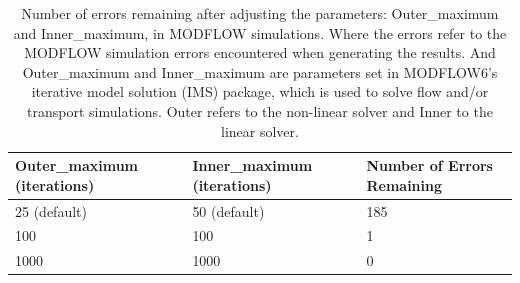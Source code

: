 \begin{table}[ht]
\centering
\caption{Number of errors remaining after adjusting the parameters: Outer\_maximum and Inner\_maximum, in MODFLOW simulations. Where the errors refer to the MODFLOW simulation errors encountered when generating the results. And Outer\_maximum and Inner\_maximum are parameters set in MODFLOW6's iterative model solution (IMS) package, which is used to solve flow and/or transport simulations. Outer refers to the non-linear solver and Inner to the linear solver.}
\label{tab_maximum_errors}
\begin{tabularx}{\linewidth}{XXX}
\toprule
Outer\_maximum (iterations) & Inner\_maximum (iterations) & Number of Errors Remaining \\
\midrule
25 (default) & 50 (default) & 185 \\
100  & 100 & 1  \\
1000   & 1000  & 0  \\
\bottomrule
\end{tabularx}
\centering
\end{table}
